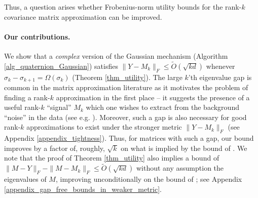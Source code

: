 \documentclass[11pt,letterpaper]{article}
\begin{document}
Thus, a question arises whether  Frobenius-norm utility bounds for the rank-$k$ covariance matrix approximation can be improved. 

\paragraph{Our contributions.} We show that a {\em complex}  version of the Gaussian mechanism (Algorithm \ref{alg_quaternion_Gaussian}) satisfies $\|Y- M_k\|_F \leq \tilde{O}(\sqrt{kd})$   whenever $\sigma_{k}-\sigma_{k+1} =\Omega(\sigma_k)$ (Theorem \ref{thm_utility}).
%
The large $k$'th eigenvalue gap is common in the matrix approximation literature as it motivates the problem of finding a rank-$k$ approximation in the first place --
 it suggests the presence of a useful rank-$k$ ``signal'' $M_k$ which one wishes to extract from the background ``noise'' in the data (see e.g. \cite{dwork2014analyze}).
% 
Moreover, such a gap is also necessary for good rank-$k$ approximations to exist under the stronger metric $\|Y- M_k\|_F$ (see Appendix \ref{appendix_tightness}).
%
Thus, for matrices with such a gap, our bound improves by a factor
%
of, roughly, $\sqrt{k}$ on what is implied by the bound of \cite{dwork2014analyze}.
%
We note that the proof of Theorem \ref{thm_utility} also implies a bound of  $\|M-Y\|_F- \|M-M_k\|_F \leq \tilde{O}(\sqrt{kd})$ without any assumption the eigenvalues of $M$, improving unconditionally on the bound of   \cite{dwork2014analyze}; see Appendix \ref{appendix_gap_free_bounds_in_weaker_metric}. 

%
\end{document}

